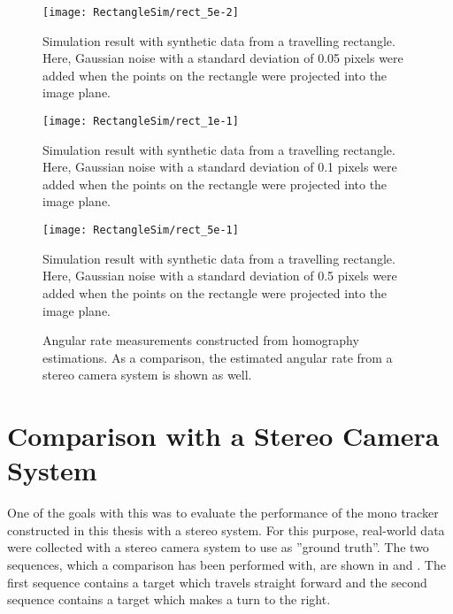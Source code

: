 \begin{figure}[!ht]
	\centering
	\texttt{[image: RectangleSim/rect\_5e-2]}
	\caption{\label{fig:rectsim5e-2} Simulation result with synthetic data from a travelling rectangle. Here, Gaussian noise with a standard deviation of 0.05 pixels were added when the points on the rectangle were projected into the image plane.}
\end{figure}

\begin{figure}[!ht]
	\centering
	\texttt{[image: RectangleSim/rect\_1e-1]}
	\caption{\label{fig:rectsim1e-1} Simulation result with synthetic data from a travelling rectangle. Here, Gaussian noise with a standard deviation of 0.1 pixels were added when the points on the rectangle were projected into the image plane.}
\end{figure}

\begin{figure}[!ht]
	\centering
	\texttt{[image: RectangleSim/rect\_5e-1]}
	\caption{\label{fig:rectsim5e-1} Simulation result with synthetic data from a travelling rectangle. Here, Gaussian noise with a standard deviation of 0.5 pixels were added when the points on the rectangle were projected into the image plane.}
\end{figure}

\begin{figure}[!ht]
	\centering

	\caption{\label{fig:angvelmeas} Angular rate measurements constructed from homography estimations. As a comparison, the estimated angular rate from a stereo camera system is shown as well.}
\end{figure}

\clearpage

\section{Comparison with a Stereo Camera System}
One of the goals with this \ms was to evaluate the performance of the mono tracker constructed in this thesis with a stereo system.
For this purpose, real-world data were collected with a stereo camera system to use as ''ground truth''.
The two sequences, which a comparison has been performed with, are shown in  and .
The first sequence contains a target which travels straight forward and the second sequence contains a target which makes a turn to the right.

